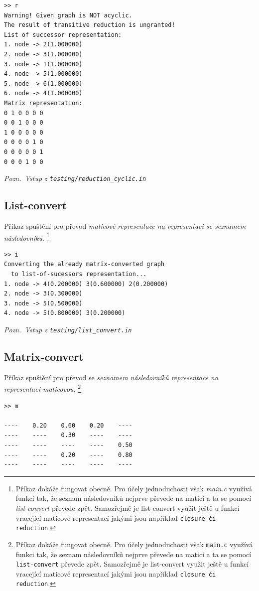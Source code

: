 \documentclass[11pt,a4paper]{article}
\begin{document}
\begin{verbatim}
>> r
Warning! Given graph is NOT acyclic.
The result of transitive reduction is ungranted!
List of successor representation:
1. node -> 2(1.000000)
2. node -> 3(1.000000)
3. node -> 1(1.000000)
4. node -> 5(1.000000)
5. node -> 6(1.000000)
6. node -> 4(1.000000)
Matrix representation:
0 1 0 0 0 0 
0 0 1 0 0 0 
1 0 0 0 0 0 
0 0 0 0 1 0 
0 0 0 0 0 1 
0 0 0 1 0 0 
\end{verbatim}

{\noindent \sl Pozn.~Vstup z \tt testing/reduction\_cyclic.in}

\subsection{List-convert}
Příkaz spuštění pro převod {\sl maticové \rm representace na representaci se
  \sl seznamem následovníků\/}.%
\footnote{Příkaz dokáže fungovat obecně.
Pro účely jednoduchosti však {\sl main.c} využívá funkci tak, že seznam
  následovníků nejprve převede na matici a ta se pomocí {\sl list-convert}
  převede zpět.
Samozřejmě je list-convert využit ještě u funkcí vracející maticové
  representací jakými jsou například {\tt closure\/ {\rm či} reduction\/}.
}
\vfil\eject
\begin{verbatim}
>> i
Converting the already matrix-converted graph
  to list-of-sucessors representation...
1. node -> 4(0.200000) 3(0.600000) 2(0.200000)
2. node -> 3(0.300000)
3. node -> 5(0.500000)
4. node -> 5(0.800000) 3(0.200000)
\end{verbatim}

{\noindent \sl Pozn.~Vstup z \tt testing/list\_convert.in}

\subsection{Matrix-convert}
Příkaz spuštění pro převod se {\sl seznamem následovníků \rm representace na
  representaci \sl maticovou\/}.%
\footnote{Příkaz dokáže fungovat obecně.
Pro účely jednoduchosti však {\tt main.c} využívá funkci tak, že seznam
  následovníků nejprve převede na matici a ta se pomocí {\tt list-convert}
  převede zpět.
Samozřejmě je list-convert využit ještě u funkcí vracející maticové
  representací jakými jsou například {\tt closure či \tt reduction\/}.
}

\begin{verbatim}
>> m

----    0.20    0.60    0.20    ----
----    ----    0.30    ----    ----
----    ----    ----    ----    0.50
----    ----    0.20    ----    0.80
----    ----    ----    ----    ----
\end{verbatim}
\end{document}
